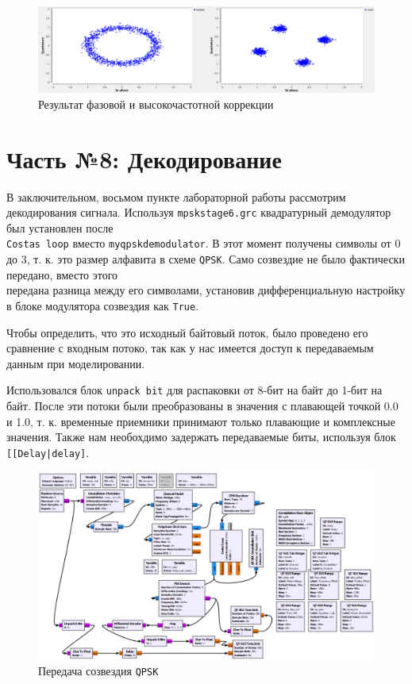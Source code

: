 \documentclass[a4paper]{article}
\begin{document}
            \begin{figure}[H]
                \centering
                \includegraphics[width=\textwidth]{ex_7_3.png}
                \caption{Результат фазовой и высокочастотной коррекции}
                \label{fig:ex_7_3}
            \end{figure}
            
    \newpage
        \section{Часть №8: Декодирование}
            В заключительном, восьмом пункте лабораторной работы рассмотрим декодирования сигнала. Используя \texttt{mpskstage6.grc} квадратурный демодулятор был установлен после \\\texttt{Costas loop} вместо \texttt{myqpskdemodulator}. В этот момент получены символы от 0 до 3, т. к. это размер алфавита в схеме \texttt{QPSK}. Само созвездие не было фактически передано, вместо этого \\передана разница между его символами, установив дифференциальную настройку в блоке модулятора созвездия как \texttt{True}. 
            
            Чтобы определить, что это исходный байтовый поток, было проведено его сравнение с входным потоко, так как у нас имеется доступ к передаваемым данным при моделировании. 
            
            Использовался блок \texttt{unpack bit} для распаковки от 8-бит на байт до 1-бит на байт. После эти потоки были преобразованы в значения с плавающей точкой 0.0 и 1.0, т. к. временные приемники принимают только плавающие и комплексные значения. Также нам необохдимо задержать передаваемые биты, используя блок \texttt{[[Delay|delay]}.

             \begin{figure}[H]
                \centering
                \includegraphics[width=\textwidth]{ex_8_1.png}
                \caption{Передача созвездия \texttt{QPSK}}
                \label{fig:ex_8_1}
            \end{figure}
            
\end{document}

